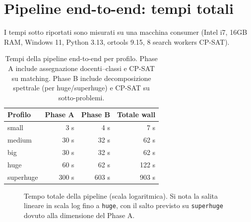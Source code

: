 \section{Pipeline end-to-end: tempi totali}

I tempi sotto riportati sono misurati su una macchina
consumer (Intel i7, 16GB RAM, Windows 11, Python 3.13,
ortools 9.15, 8 search workers CP-SAT).

\begin{table}[h]
\centering
\sffamily\small
\begin{tabular}{lrrr}
\toprule
Profilo    & Phase A & Phase B & Totale wall \\
\midrule
small      &  3 s    &  4 s    &   7 s  \\
medium     & 30 s    & 32 s    &  62 s  \\
big        & 30 s    & 32 s    &  62 s  \\
huge       & 60 s    & 62 s    & 122 s  \\
superhuge  & 300 s   & 603 s   & 903 s  \\
\bottomrule
\end{tabular}
\caption{Tempi della pipeline end-to-end per profilo.
Phase A include assegnazione docenti--classi e CP-SAT su
matching. Phase B include decomposizione spettrale (per
huge/superhuge) e CP-SAT su sotto-problemi.}
\label{tab:bench-times}
\end{table}

\begin{figure}[h]
\centering
{}
\caption{Tempo totale della pipeline (scala logaritmica).
Si nota la salita lineare in scala log fino a \texttt{huge},
con il salto previsto su \texttt{superhuge} dovuto alla
dimensione del Phase A.}
\label{fig:bench-times}
\end{figure}

